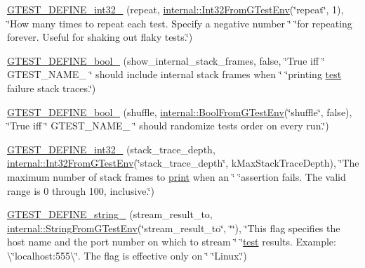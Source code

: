 \begin{DoxyCompactItemize}
\item 
\mbox{\hyperlink{namespacetesting_aae6f1140f03d7bf24067df0f6628e9ea}{G\+T\+E\+S\+T\+\_\+\+D\+E\+F\+I\+N\+E\+\_\+int32\+\_\+}} (repeat, \mbox{\hyperlink{namespacetesting_1_1internal_a0f7e728793f9e6cb0aa2b69eaa468bf3}{internal\+::\+Int32\+From\+G\+Test\+Env}}(\char`\"{}repeat\char`\"{}, 1), \char`\"{}How many times to repeat each test.  Specify a negative number \char`\"{} \char`\"{}for repeating forever.  Useful for shaking out flaky tests.\char`\"{})
\item 
\mbox{\hyperlink{namespacetesting_a60ef38aa9d1437f0d7818181897af8ef}{G\+T\+E\+S\+T\+\_\+\+D\+E\+F\+I\+N\+E\+\_\+bool\+\_\+}} (show\+\_\+internal\+\_\+stack\+\_\+frames, false, \char`\"{}True iff \char`\"{} G\+T\+E\+S\+T\+\_\+\+N\+A\+M\+E\+\_\+ \char`\"{} should include internal stack frames when \char`\"{} \char`\"{}printing \mbox{\hyperlink{_mutual_8h_a707ee03719e99670bf6cfdfd897b8456}{test}} failure stack traces.\char`\"{})
\item 
\mbox{\hyperlink{namespacetesting_af95276e3deb9d243d729f3043eabd272}{G\+T\+E\+S\+T\+\_\+\+D\+E\+F\+I\+N\+E\+\_\+bool\+\_\+}} (shuffle, \mbox{\hyperlink{namespacetesting_1_1internal_a67132cdce23fb71b6c38ee34ef81eb4c}{internal\+::\+Bool\+From\+G\+Test\+Env}}(\char`\"{}shuffle\char`\"{}, false), \char`\"{}True iff \char`\"{} G\+T\+E\+S\+T\+\_\+\+N\+A\+M\+E\+\_\+ \char`\"{} should randomize tests\textquotesingle{} order on every run.\char`\"{})
\item 
\mbox{\hyperlink{namespacetesting_a84af642630c9181f00fcf0a4a63e795e}{G\+T\+E\+S\+T\+\_\+\+D\+E\+F\+I\+N\+E\+\_\+int32\+\_\+}} (stack\+\_\+trace\+\_\+depth, \mbox{\hyperlink{namespacetesting_1_1internal_a0f7e728793f9e6cb0aa2b69eaa468bf3}{internal\+::\+Int32\+From\+G\+Test\+Env}}(\char`\"{}stack\+\_\+trace\+\_\+depth\char`\"{}, k\+Max\+Stack\+Trace\+Depth), \char`\"{}The maximum number of stack frames to \mbox{\hyperlink{_output_8h_a44e8f67d499345dd94e7d05b8d2e71b9}{print}} when an \char`\"{} \char`\"{}assertion fails.  The valid range is 0 through 100, inclusive.\char`\"{})
\item 
\mbox{\hyperlink{namespacetesting_a5cfe9778e1cc8b5cf04bfe9e764ddff6}{G\+T\+E\+S\+T\+\_\+\+D\+E\+F\+I\+N\+E\+\_\+string\+\_\+}} (stream\+\_\+result\+\_\+to, \mbox{\hyperlink{namespacetesting_1_1internal_a7ed785df46a339403b0f749d3a879201}{internal\+::\+String\+From\+G\+Test\+Env}}(\char`\"{}stream\+\_\+result\+\_\+to\char`\"{}, \char`\"{}\char`\"{}), \char`\"{}This flag specifies the host name and the port number on which to stream \char`\"{} \char`\"{}\mbox{\hyperlink{_mutual_8h_a707ee03719e99670bf6cfdfd897b8456}{test}} results. Example\+: \textbackslash{}\char`\"{}localhost\+:555\textbackslash{}\char`\"{}. The flag is effective only on \char`\"{} \char`\"{}Linux.\char`\"{})

\end{DoxyCompactItemize}
